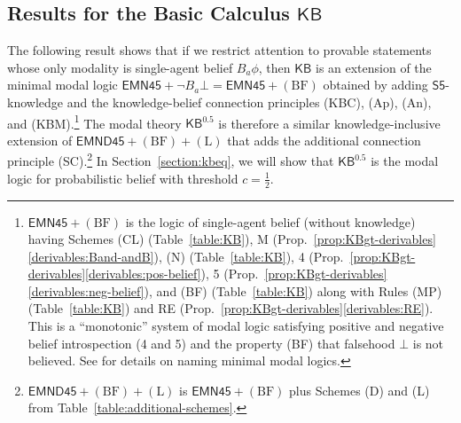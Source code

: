 \documentclass[12pt]{article}
\theoremstyle{definition}
\newcommand{\KB}{{\mathsf{KB}}}                        %
\newcommand{\KBeq}{{\mathsf{KB}^{\mathsf{0.5}}}}       %
\begin{document}
\subsection{Results for the Basic Calculus \texorpdfstring{$\KB$}{KB}}

The following result shows that if we restrict attention to provable
statements whose only modality is single-agent belief $B_a\phi$, then
$\KB$ is an extension of the minimal modal logic $\mathsf{EMN45}+\lnot
B_a\bot=\mathsf{EMN45}+(\text{BF})$ obtained by adding
$\mathsf{S5}$-knowledge and the knowledge-belief connection principles
(KBC), (Ap), (An), and (KBM).\footnote{$\mathsf{EMN45}+(\text{BF})$ is
  the logic of single-agent belief (without knowledge) having Schemes
  (CL) (Table~\ref{table:KB}), M
  (Prop.~\ref{prop:KBgt-derivables}\eqref{derivables:Band-andB}), (N)
  (Table~\ref{table:KB}), 4
  (Prop.~\ref{prop:KBgt-derivables}\eqref{derivables:pos-belief}), 5
  (Prop.~\ref{prop:KBgt-derivables}\eqref{derivables:neg-belief}), and
  (BF) (Table~\ref{table:KB}) along with Rules (MP)
  (Table~\ref{table:KB}) and RE
  (Prop.~\ref{prop:KBgt-derivables}\eqref{derivables:RE}). This is a
  ``monotonic'' system of modal logic satisfying positive and negative
  belief introspection (4 and 5) and the property (BF) that falsehood
  $\bot$ is not believed. See \cite[Ch.~8]{Chellas:ml} for details on
  naming minimal modal logics.} The modal theory $\KBeq$ is therefore
a similar knowledge-inclusive extension of
$\mathsf{EMND45}+(\text{BF})+(\text{L})$ that adds the additional
connection principle
(SC).\footnote{$\mathsf{EMND45}+(\text{BF})+(\text{L})$ is
  $\mathsf{EMN45}+(\text{BF})$ plus Schemes (D) and (L) from
  Table~\ref{table:additional-schemes}.}  In
Section~\ref{section:kbeq}, we will show that $\KBeq$ is the modal
logic for probabilistic belief with threshold $c=\frac 12$.
\end{document}

